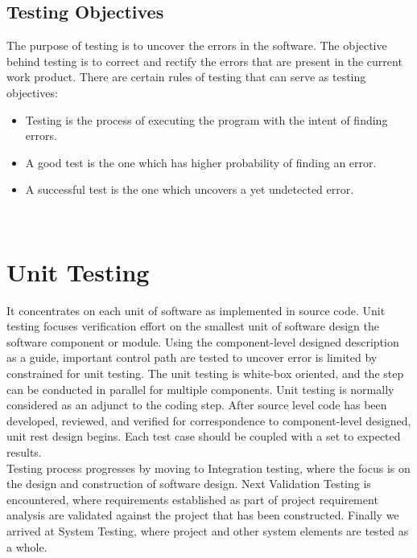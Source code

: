 \documentclass{SureshLimkar}
\begin{document}
\subsection{Testing Objectives}
\hspace{0.5 in}
The purpose of testing is to uncover the errors in the software. The objective behind testing is to correct and rectify the errors that are present in the current work product. There are certain rules of testing that can serve as testing objectives:
\begin{itemize}
\item Testing is the process of executing the program with the intent of finding errors.
\item A good test is the one which has higher probability of finding an error.
\item A successful test is the one which uncovers a yet undetected error.
\end{itemize}
\\

\section{Unit Testing}
\hspace{0.5 in}It concentrates on each unit of software as implemented in source code. Unit testing focuses verification effort on the smallest unit of software design the software component or module. Using the component-level designed description as a guide, important control path are tested to uncover error is limited by constrained for unit testing. The unit testing is white-box oriented, and the step can be conducted in parallel for multiple components. Unit testing is normally considered as an adjunct to the coding step. After source level code has been developed, reviewed, and verified for correspondence to component-level designed, unit rest design begins. Each test case should be coupled with a set to expected results.
\\
\hspace{0.5 in} Testing process progresses by moving to Integration testing, where the focus is on the design and construction of software design. Next Validation Testing is encountered, where requirements established as part of project requirement analysis are validated against the project that has been constructed. Finally we arrived at System Testing, where project and other system elements are tested as a whole.
\end{document}
